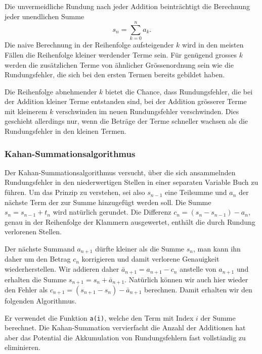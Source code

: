 Die unvermeidliche Rundung nach jeder Addition beinträchtigt die Berechnung
jeder unendlichen Summe
\[
s_n
=
\sum_{k=0}^n a_k.
\]
Die naive Berechnung in der Reihenfolge aufsteigender $k$ wird in den
meisten Fällen die Reihenfolge kleiner werdender Terme sein.
Für genügend grosses $k$ werden die zusätzlichen Terme von ähnlicher 
Grössenordnung sein wie die Rundungsfehler, die sich bei den ersten
Termen bereits gebildet haben.

Die Reihenfolge abnehmender $k$ bietet die Chance, dass Rundungsfehler,
die bei der Addition kleiner Terme entstanden sind, bei der Addition
grösserer Terme mit kleinerem $k$ verschwinden im neuen Rundungsfehler
verschwinden.
Dies geschieht allerdings nur, wenn die Beträge der Terme schneller 
wachsen als die Rundungsfehler in den kleinen Termen.

\subsubsection{Kahan-Summationsalgorithmus}
Der Kahan-Summationsalgorithmus versucht, über die sich ansammelnden
Rundungsfehler in den niederwertigen Stellen in einer separaten 
Variable Buch zu führen.
Um das Prinzip zu verstehen, sei also $s_{n-1}$ eine Teilsumme und $a_n$ der
nächste Term der zur Summe hinzugefügt werden soll. 
Die Summe $s_n=s_{n-1} + t_n$ wird natürlich gerundet.
Die Differenz $c_n = (s_n - s_{n-1}) - a_n$, genau in der Reihenfolge
der Klammern ausgewertet, enthält die durch Rundung verlorenen Stellen.

Der nächste Summand $a_{n+1}$ dürfte kleiner als die Summe $s_{n}$, 
man kann ihn daher um den Betrag $c_n$ korrigieren und damit verlorene
Genauigkeit wiederherstellen.
Wir addieren daher $\bar a_{n+1} = a_{n+1}-c_n$ anstelle von $a_{n+1}$
und erhalten die Summe $s_{n+1} = s_n + \bar{a}_{n+1}$.
Natürlich können wir auch hier wieder den Fehler als
$c_{n+1} = (s_{n+1} - s_{n}) - \bar{a}_{n+1}$ berechnen.
Damit erhalten wir den folgenden Algorithmus.

Er verwendet die Funktion \texttt{a(i)}, welche den Term mit Index $i$
der Summe berechnet.
Die Kahan-Summation vervierfacht die Anzahl der Additionen hat aber das
Potential die Akkumulation von Rundungsfehlern fast vollständig zu 
eliminieren.

